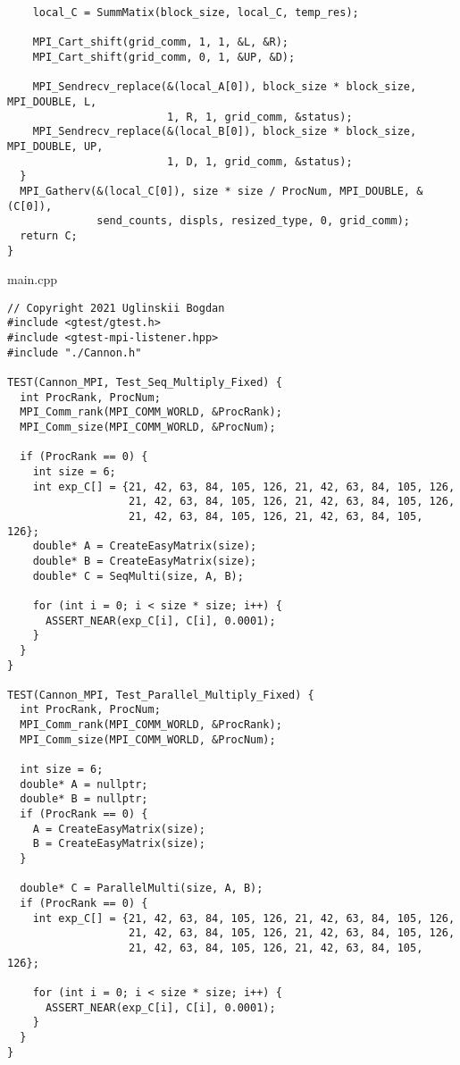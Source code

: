 \documentclass[12pt, letterpaper]{article}
\begin{document}
\begin{lstlisting}
    local_C = SummMatix(block_size, local_C, temp_res);

    MPI_Cart_shift(grid_comm, 1, 1, &L, &R);
    MPI_Cart_shift(grid_comm, 0, 1, &UP, &D);

    MPI_Sendrecv_replace(&(local_A[0]), block_size * block_size, MPI_DOUBLE, L,
                         1, R, 1, grid_comm, &status);
    MPI_Sendrecv_replace(&(local_B[0]), block_size * block_size, MPI_DOUBLE, UP,
                         1, D, 1, grid_comm, &status);
  }
  MPI_Gatherv(&(local_C[0]), size * size / ProcNum, MPI_DOUBLE, &(C[0]),
              send_counts, displs, resized_type, 0, grid_comm);
  return C;
}

\end{lstlisting}

main.cpp
\begin{lstlisting}
// Copyright 2021 Uglinskii Bogdan
#include <gtest/gtest.h>
#include <gtest-mpi-listener.hpp>
#include "./Cannon.h"

TEST(Cannon_MPI, Test_Seq_Multiply_Fixed) {
  int ProcRank, ProcNum;
  MPI_Comm_rank(MPI_COMM_WORLD, &ProcRank);
  MPI_Comm_size(MPI_COMM_WORLD, &ProcNum);

  if (ProcRank == 0) {
    int size = 6;
    int exp_C[] = {21, 42, 63, 84, 105, 126, 21, 42, 63, 84, 105, 126,
                   21, 42, 63, 84, 105, 126, 21, 42, 63, 84, 105, 126,
                   21, 42, 63, 84, 105, 126, 21, 42, 63, 84, 105, 126};
    double* A = CreateEasyMatrix(size);
    double* B = CreateEasyMatrix(size);
    double* C = SeqMulti(size, A, B);

    for (int i = 0; i < size * size; i++) {
      ASSERT_NEAR(exp_C[i], C[i], 0.0001);
    }
  }
}

TEST(Cannon_MPI, Test_Parallel_Multiply_Fixed) {
  int ProcRank, ProcNum;
  MPI_Comm_rank(MPI_COMM_WORLD, &ProcRank);
  MPI_Comm_size(MPI_COMM_WORLD, &ProcNum);

  int size = 6;
  double* A = nullptr;
  double* B = nullptr;
  if (ProcRank == 0) {
    A = CreateEasyMatrix(size);
    B = CreateEasyMatrix(size);
  }

  double* C = ParallelMulti(size, A, B);
  if (ProcRank == 0) {
    int exp_C[] = {21, 42, 63, 84, 105, 126, 21, 42, 63, 84, 105, 126,
                   21, 42, 63, 84, 105, 126, 21, 42, 63, 84, 105, 126,
                   21, 42, 63, 84, 105, 126, 21, 42, 63, 84, 105, 126};

    for (int i = 0; i < size * size; i++) {
      ASSERT_NEAR(exp_C[i], C[i], 0.0001);
    }
  }
}


\end{lstlisting}
\end{document}
